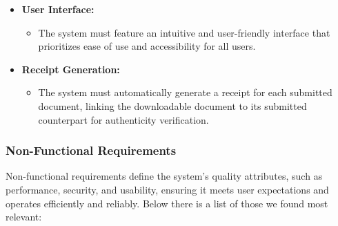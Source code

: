 \documentclass[a4paper,11pt]{article}
\begin{document}
\begin{itemize}
                    \item \textbf{User Interface:} 
                    \begin{itemize}
                        \item The system must feature an intuitive and user-friendly interface that prioritizes ease of use and accessibility for all users.
                    \end{itemize}
                    
                    \item \textbf{Receipt Generation:} 
                    \begin{itemize}
                        \item The system must automatically generate a receipt for each submitted document, linking the downloadable document to its submitted counterpart for authenticity verification.
                    \end{itemize}
                \end{itemize}
        
            \subsubsection{Non-Functional Requirements}
            \quad Non-functional requirements define the system's quality attributes, such as performance, security, and usability, ensuring it meets user expectations and operates efficiently and reliably. Below there is a list of those we found most relevant:
        
\end{document}
